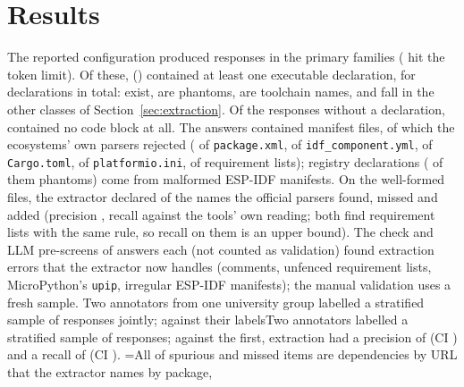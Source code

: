 \documentclass[conference]{IEEEtran}
\newif\ifpilot     \pilotfalse      %
\begin{document}
\section{Results}
\label{sec:results}

The reported configuration produced \rNGen{} responses in the primary families (\rNTrunc{} hit the token limit).
Of these, \rNRespDecl{} (\rYield) contained at least one executable declaration, for \rNDecl{} declarations in total:
\rNExists{} exist, \rNPhantom{} are phantoms, \rNToolchain{} are toolchain names, and \rNOtherDecl{} fall in the
other classes of Section~\ref{sec:extraction}. Of the \rNRespNoDecl{} responses without a declaration, \rNRespNoBlock{} contained no code block at all. The
answers contained \rNFiles{} manifest files, of which the ecosystems' own parsers rejected \rNFilesMalformed{}
(\rFilesXmlBad{} of \rFilesXml{} \texttt{package.xml}, \rFilesIdfBad{} of \rFilesIdf{} \texttt{idf\_component.yml},
\rFilesCargoBad{} of \rFilesCargo{} \texttt{Cargo.toml}, \rFilesPioBad{} of \rFilesPio{} \texttt{platformio.ini},
\rFilesReqBad{} of \rFilesReq{} requirement lists); \rNMalformed{} registry declarations (\rNMalformedPhantom{} of them
phantoms) come from malformed ESP-IDF manifests. On the well-formed files, the extractor declared \rOffTp{} of the
names the official parsers found, missed \rOffFn{} and added \rOffFp{} (precision \rOffPrecision, recall
\rOffRecall{} against the tools' own reading; both find requirement lists with the same rule, so recall on them is an
upper bound). \ifpilot The check found one gap, which the extractor now closes: requirement lists in code blocks
labelled as Python or shell that the text right before them calls requirements.\else The check and \rNPrescreenWord{} LLM
pre-screens of \rPrescreenEach{} answers each (not counted as validation) found extraction errors that the extractor now
handles (comments, unfenced requirement lists, MicroPython's \texttt{upip}, irregular ESP-IDF manifests); the manual
validation uses a fresh sample.\fi
\ifnum{} \ifnum{} Two annotators from one university group labelled a stratified
sample of \rValN{} responses jointly; against their labels\else Two annotators labelled a stratified sample of \rValN{}
responses; against the first\fi, extraction had a precision of \rValPrecision{} (CI \rValPrecisionCI) and a recall
of \rValRecall{} (CI \rValRecallCI). \ifnum\rValSpurNonreg=\rValSpur\relax All \rValSpur\else\rValSpurNonreg{} of
\rValSpur\fi{} spurious and \rValMissNonreg{} missed items are dependencies by URL that the extractor names by package,
\end{document}
